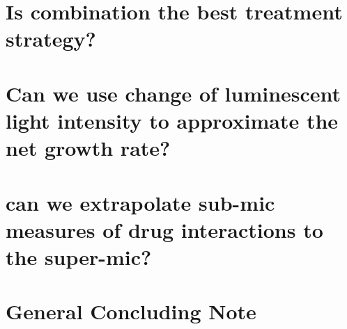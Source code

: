 \documentclass[../main.tex]{subfiles}
\begin{document}
\section{Is combination the best treatment strategy?}

\section{Can we use change of luminescent light intensity to approximate the net growth rate?}

\section{can we extrapolate sub-mic measures of drug interactions to the super-mic?}

\section{General Concluding Note}
\end{document}
